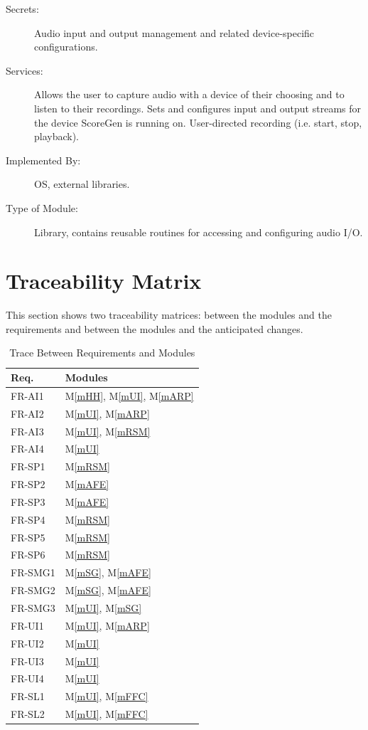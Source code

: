 \documentclass[12pt, titlepage]{article}
\newcommand{\mref}[1]{M\ref{#1}}
\begin{document}
\begin{description}
\item[Secrets:] Audio input and output management and related device-specific configurations.
\item[Services:] Allows the user to capture audio with a device of their choosing and to listen to their recordings.
  Sets and configures input and output streams for the device ScoreGen is running on.
  User-directed recording (i.e. start, stop, playback).
\item[Implemented By:] OS, external libraries.
\item[Type of Module:] Library, contains reusable routines for accessing and configuring audio I/O.
\end{description}

\section{Traceability Matrix} \label{SecTM}

This section shows two traceability matrices: between the modules and the
requirements and between the modules and the anticipated changes.

\begin{table}[H]
\centering
\begin{tabular}{p{} p{}}
\toprule
\textbf{Req.} & \textbf{Modules}\\
\midrule
FR-AI1 & \mref{mHH}, \mref{mUI}, \mref{mARP}\\
FR-AI2 & \mref{mUI}, \mref{mARP}\\
FR-AI3 & \mref{mUI}, \mref{mRSM}\\
FR-AI4 & \mref{mUI}\\
FR-SP1 & \mref{mRSM}\\
FR-SP2 & \mref{mAFE}\\
FR-SP3 & \mref{mAFE}\\
FR-SP4 & \mref{mRSM}\\
FR-SP5 & \mref{mRSM}\\
FR-SP6 & \mref{mRSM}\\
FR-SMG1 & \mref{mSG}, \mref{mAFE}\\
FR-SMG2 & \mref{mSG}, \mref{mAFE}\\
FR-SMG3 & \mref{mUI}, \mref{mSG}\\
FR-UI1 & \mref{mUI}, \mref{mARP}\\
FR-UI2 & \mref{mUI}\\
FR-UI3 & \mref{mUI}\\
FR-UI4 & \mref{mUI}\\
FR-SL1 & \mref{mUI}, \mref{mFFC}\\
FR-SL2 & \mref{mUI}, \mref{mFFC}\\
\bottomrule
\end{tabular}
\caption{Trace Between Requirements and Modules}
\label{TblRT}
\end{table}
\end{document}
